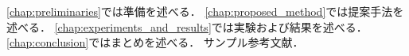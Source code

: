 \cref{chap:preliminaries}では準備を述べる．
\cref{chap:proposed_method}では提案手法を述べる．
\cref{chap:experiments_and_results}では実験および結果を述べる．
\cref{chap:conclusion}ではまとめを述べる．
サンプル参考文献\cite{sample2023}．
